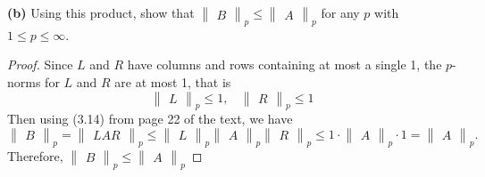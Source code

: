 \documentclass{article}
\begin{document}
\textbf{(b)} Using this product, show that
$
\begin{Vmatrix}
    B
\end{Vmatrix}_p
\leq 
\begin{Vmatrix}
    A
\end{Vmatrix}_p
$
for any $p$ with $1 \leq p \leq \infty$.
\begin{proof}
    Since $L$ and $R$ have columns and rows containing at most a single 1, the $p$-norms for $L$ and $R$ are at most 1, that is
    \[
        \begin{Vmatrix}
            L
        \end{Vmatrix}_p
        \leq 1
        ,
        ~~~~
        \begin{Vmatrix}
            R
        \end{Vmatrix}_p
        \leq 1
    \]
    Then using (3.14) from page 22 of the text, we have 
    \[
        \begin{Vmatrix}
            B
        \end{Vmatrix}_p
        = 
        \begin{Vmatrix}
            LAR
        \end{Vmatrix}_p
        \leq
        \begin{Vmatrix}
            L
        \end{Vmatrix}_p
        \begin{Vmatrix}
            A
        \end{Vmatrix}_p
        \begin{Vmatrix}
            R
        \end{Vmatrix}_p
        \leq
        1 \cdot
        \begin{Vmatrix}
            A
        \end{Vmatrix}_p
        \cdot 1
        =
        \begin{Vmatrix}
            A
        \end{Vmatrix}_p.
    \]
    Therefore, $
    \begin{Vmatrix}
        B
    \end{Vmatrix}_p
    \leq 
    \begin{Vmatrix}
        A
    \end{Vmatrix}_p
    $
\end{proof}
\end{document}
